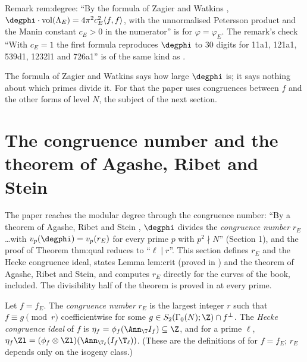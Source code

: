 \begin{paperlink}\label{pl:moddeg:zw}
Remark rem:degree: ``By the formula of Zagier and Watkins \cite{Zagier85,Watkins02}, $\degphi\cdot\operatorname{vol}(\Lambda_E)=4\pi^2c_E^2\langle f,f\rangle$, with the unnormalised Petersson product
and the Manin constant $c_E>0$ in the numerator'' is  for $\varphi=\varphi_E$. The remark's check ``With $c_E=1$ the first formula reproduces $\degphi$ to $30$
digits for 11a1, 121a1, 539d1, 1232l1 and 726a1'' is of the same kind as .
\end{paperlink}

The formula of Zagier and Watkins says how large $\degphi$ is; it says nothing about which primes divide it. For that the paper uses congruences between $f$ and
the other forms of level $N$, the subject of the next section.

\section[The congruence number and Agashe-Ribet-Stein]{The congruence number and the theorem of Agashe, Ribet and Stein}\label{sec:moddeg:congruence}

The paper reaches the modular degree through the congruence number: ``By a theorem of Agashe, Ribet and Stein \cite[Theorem 2.2]{ARS12}, $\degphi$ divides the
\emph{congruence number} $r_E$ \dots with $v_p(\degphi)=v_p(r_E)$ for every prime $p$ with $p^2\nmid N$'' (Section 1), and the proof of Theorem thm:qual reduces to ``$\ell\mid r$''. This
section defines $r_E$ and the Hecke congruence ideal, states Lemma lem:crit (proved in ) and the theorem of Agashe, Ribet and Stein, and computes $r_E$
directly for the curves of the book,  included. The divisibility half of the theorem is proved in  at every prime.

\begin{definition}\label{def:moddeg:congruence-number}
Let $f=f_E$. The \emph{congruence number} $r_E$ is the largest integer $r$ such that $f\equiv g\pmod r$ coefficientwise for some $g\in S_2(\Gamma_0(N);\Z)\cap f^\perp$. The
\emph{Hecke congruence ideal} of $f$ is $\eta_f=\phi_f(\Ann_\T I_f)\subseteq\Z$, and for a prime $\ell$, $\eta_f\Zl=(\phi_f\otimes\Zl)(\Ann_{\T_\ell}(I_f\T_\ell))$. (These are the definitions of
 for $f=f_E$; $r_E$ depends only on the isogeny class.)
\end{definition}

